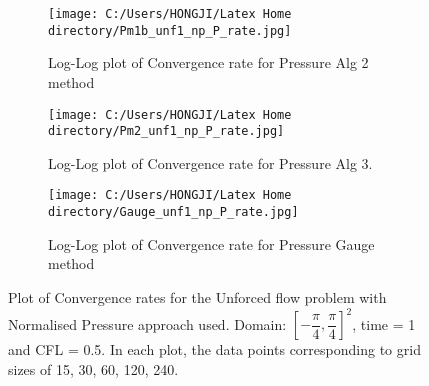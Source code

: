 \begin{figure}[H]
	\centering
	\begin{subfigure}[t]{4.5in}
		\centering
		\texttt{[image: C:/Users/HONGJI/Latex Home directory/Pm1b\_unf1\_np\_P\_rate.jpg]}
		\caption{Log-Log plot of Convergence rate for Pressure Alg 2 method}\label{fig:6.19a}		
	\end{subfigure}
	\quad
	\begin{subfigure}[t]{4.5in}
		\centering
		\texttt{[image: C:/Users/HONGJI/Latex Home directory/Pm2\_unf1\_np\_P\_rate.jpg]}
		\caption{Log-Log plot of Convergence rate for Pressure Alg 3. }\label{fig:6.19b}
	\end{subfigure}
	\quad
	\begin{subfigure}[t]{4.5in}
		\centering
		\texttt{[image: C:/Users/HONGJI/Latex Home directory/Gauge\_unf1\_np\_P\_rate.jpg]}
		\caption{Log-Log plot of Convergence rate for Pressure Gauge method }\label{fig:6.19b}
	\end{subfigure}
	\caption{Plot of Convergence rates for the Unforced flow problem with Normalised Pressure approach used. Domain: $[-\dfrac{\pi}{4}, \dfrac{\pi}{4}]^2$, time = 1 and CFL = 0.5. In each plot, the data points corresponding to grid sizes of 15, 30, 60, 120, 240.}\label{fig:6.16}
\end{figure}

